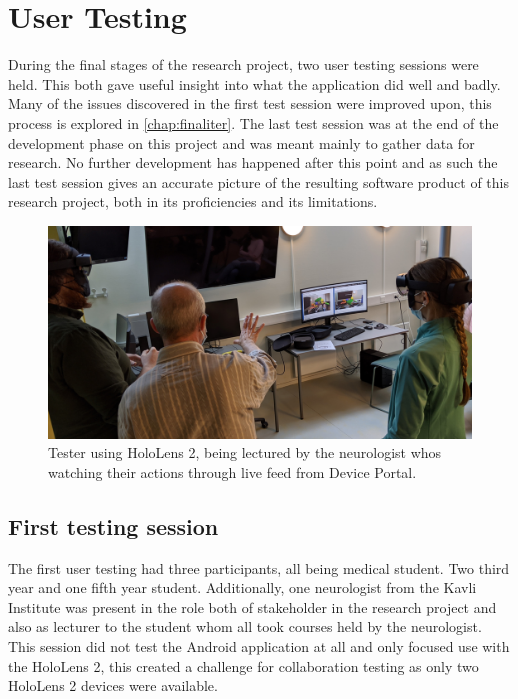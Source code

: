 \section{User Testing}
During the final stages of the research project, two user testing sessions were held. This both gave useful insight into what the application did well and badly. Many of the issues discovered in the first test session were improved upon, this process is explored in \autoref{chap:finaliter}. The last test session was at the end of the development phase on this project and was meant mainly to gather data for research. No further development has happened after this point and as such the last test session gives an accurate picture of the resulting software product of this research project, both in its proficiencies and its limitations. 

\begin{figure}[ht]
    \includegraphics[width={\textwidth}]{fig/usertesthololivestream.jpg}
    \caption{Tester using HoloLens 2, being lectured by the neurologist whos watching their actions through live feed from Device Portal.}
    \label{fig:usertesthololivestream}
\end{figure}

\subsection{First testing session}

The first user testing had three participants, all being medical student. Two third year and one fifth year student. Additionally, one neurologist from the Kavli Institute was present in the role both of stakeholder in the research project and also as lecturer to the student whom all took courses held by the neurologist. This session did not test the Android application at all and only focused use with the HoloLens 2, this created a challenge for collaboration testing as only two HoloLens 2 devices were available. 

